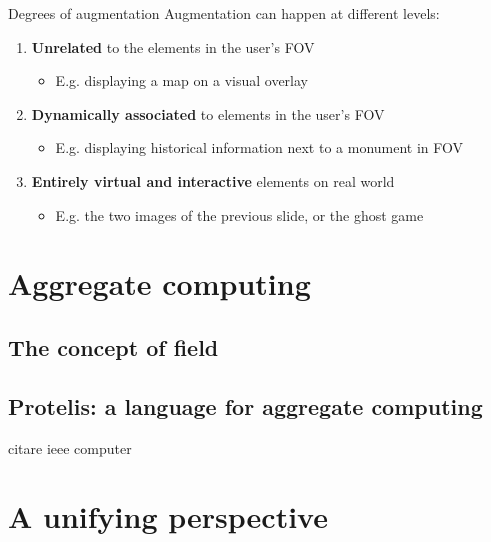 \documentclass[presentation]{beamer} %
\begin{document}
\begin{frame}{Degrees of augmentation}
  Augmentation can happen at different levels:
  \begin{enumerate}
    \item \textbf{Unrelated} to the elements in the user's FOV
      \begin{itemize}
        \item E.g. displaying a map on a visual overlay
      \end{itemize}
    \item \textbf{Dynamically associated} to elements in the user's FOV
      \begin{itemize}
        \item E.g. displaying historical information next to a monument in FOV
      \end{itemize}
    \item \textbf{Entirely virtual and interactive} elements on real world
      \begin{itemize}
        \item E.g. the two images of the previous slide, or the ghost game \cite{MirrorWorlds}
      \end{itemize}
  \end{enumerate}
\end{frame}

\section{Aggregate computing}
\subsection{The concept of field}
\subsection{Protelis: a language for aggregate computing}
citare ieee computer
\section{A unifying perspective}
\end{document}
